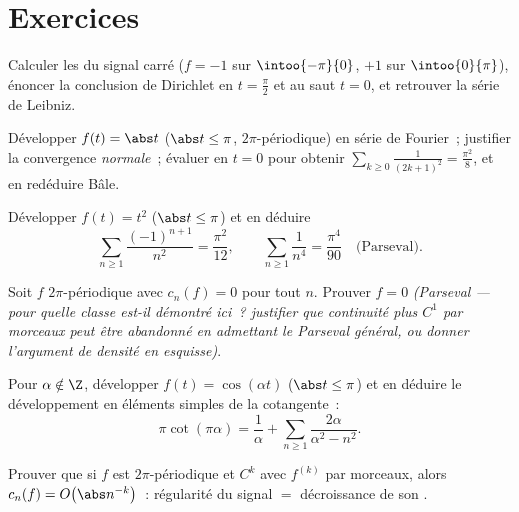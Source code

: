 \section{Exercices}

\begin{exercise}[$\star$]\label{exo:b2:fourier:1}
Calculer les  du signal carré ($f = -1$ sur
$\intoo{-\pi}{0}$, $+1$ sur $\intoo{0}{\pi}$), énoncer la conclusion
de Dirichlet en $t = \frac\pi2$ et au saut $t = 0$, et retrouver la
série de Leibniz.
\end{exercise}

\begin{exercise}[$\star$]\label{exo:b2:fourier:2}
Développer $f(t) = \abs t$ ($\abs t \leq \pi$, $2\pi$-périodique) en
série de Fourier~; justifier la convergence \emph{normale}~; évaluer
en $t = 0$ pour obtenir $\sum_{k\geq0}\frac{1}{(2k+1)^2} =
\frac{\pi^2}{8}$, et en redéduire Bâle.
\end{exercise}

\begin{exercise}[$\star$]\label{exo:b2:fourier:3}
Développer $f(t) = t^2$ ($\abs t \leq \pi$) et en déduire
\[
\sum_{n\geq1}\frac{(-1)^{n+1}}{n^2} = \frac{\pi^2}{12},
\qquad
\sum_{n\geq1}\frac{1}{n^4} = \frac{\pi^4}{90}
\quad\text{(Parseval)}.
\]
\end{exercise}

\begin{exercise}[$\star\star$]\label{exo:b2:fourier:4}
Soit $f$  $2\pi$-périodique avec $c_n(f) = 0$ pour tout $n$.
Prouver $f = 0$ \emph{(Parseval --- pour quelle classe est-il démontré
ici~? justifier que continuité plus $C^1$ par morceaux peut être
abandonné en admettant le Parseval général, ou donner l'argument de
densité en esquisse)}.
\end{exercise}

\begin{exercise}[$\star\star$]\label{exo:b2:fourier:5}
Pour $\alpha \notin \Z$, développer $f(t) = \cos(\alpha t)$ ($\abs t
\leq \pi$) et en déduire le développement en éléments simples de la
cotangente~:
\[
\pi\cot(\pi\alpha) = \frac{1}{\alpha} + \sum_{n\geq1}
\frac{2\alpha}{\alpha^2 - n^2} .
\]
\end{exercise}

\begin{exercise}[$\star\star$]\label{exo:b2:fourier:6}
Prouver que si $f$ est $2\pi$-périodique et $C^k$ avec $f^{(k)}$
 par morceaux, alors $c_n(f) = O\bigl(\abs n^{-k}\bigr)$~:
régularité du signal $=$ décroissance de son .
\end{exercise}

